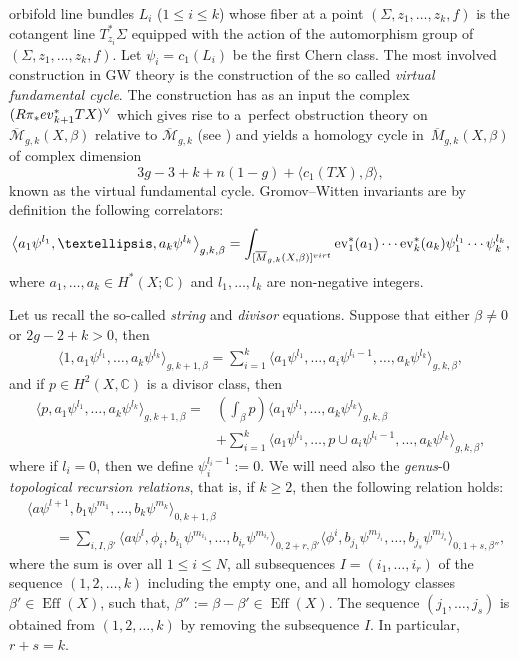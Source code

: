 \documentclass[10pt,a4paper]{article}
\numberwithin{equation}{section}
\newcommand{\CC}{\mathbb{C}}
\newcommand{\M}{\mathcal{M}}
\begin{document}
orbifold line bundles $L_i$ ($1\leq i\leq k$) whose fiber at a
point $(\Sigma,z_1,\dots,z_k,f)$ is the cotangent line
$T^*_{z_i}\Sigma$ equipped with the action of the automorphism group
of $(\Sigma,z_1,\dots,z_k,f)$. Let $\psi_i=c_1(L_i)$ be the first
Chern class. The most involved construction in GW theory is the
construction of the so called {\em virtual fundamental cycle}. The
construction has as an input the complex $(R\pi_*{\rm
 ev}_{k+1}^*TX)^\vee$ which gives rise to a~perfect obstruction
theory on $\overline{\M}_{g,k}(X,\beta)$ relative to
$\overline{\M}_{g,k}$ (see \cite{Be,BF_intnormalcone}) and yields a homology cycle in~$\overline{M}_{g,k}(X,\beta)$ of complex dimension
\[
3g-3 +k + n(1-g) + \langle c_1(TX),\beta\rangle,
\]
known as the virtual fundamental cycle. Gromov--Witten invariants are by
definition the following correlators:
\[
\big\langle a_1\psi^{l_1},\dots, a_k\psi^{l_k}\big\rangle_{g,k,\beta} =
\int_{[\overline{M}_{g,k}(X,\beta)]^{\rm virt}}
\operatorname{ev}_1^*(a_1)\cdots \operatorname{ev}_k^*(a_k)
\psi_1^{l_1}\cdots \psi_k^{l_k},
\]
where $a_1,\dots,a_k\in H^*(X;\CC)$ and $l_1,\dots,l_k$ are
non-negative integers.

Let us recall the so-called {\em string} and {\em divisor} equations. Suppose that either $\beta\neq 0$ or ${2g-2+k>0}$, then
\begin{align*}
\big\langle 1, a_1\psi^{l_1},\dots, a_k\psi^{l_k}\big\rangle_{g,k+1,\beta} =
\sum_{i=1}^k \big\langle
a_1\psi^{l_1},\dots, a_i\psi^{l_i-1}, \dots, a_k\psi^{l_k}\big\rangle_{g,k,\beta},
\end{align*}
and if $p\in H^2(X,\CC)$ is a divisor class, then
\begin{align*}
\big\langle p, a_1\psi^{l_1},\dots, a_k\psi^{l_k}\big\rangle_{g,k+1,\beta} ={} &
\left(\int_\beta p\right) \big\langle a_1\psi^{l_1},\dots, a_k\psi^{l_k}\big\rangle_{g,k,\beta} \\
&+
\sum_{i=1}^k \big\langle
a_1\psi^{l_1},\dots, p\cup a_i\psi^{l_i-1}, \dots, a_k\psi^{l_k}\big\rangle_{g,k,\beta},
\end{align*}
where if $l_i=0$, then we define $\psi_i^{l_i-1}:=0$. We will need
also the {\em genus}-0 {\em topological recursion relations}, that is,
if $k\geq 2$, then the following relation holds:
\begin{align*}
&\big\langle a \psi^{l+1}, b_1\psi^{m_1},\dots,
 b_k\psi^{m_k}
 \big\rangle_{0,k+1,\beta}
 \\
 &\qquad=
 \sum_{i, I,\beta'}\big\langle
 a \psi^l, \phi_i,
 b_{i_1} \psi^{m_{i_1}},\dots,
 b_{i_r} \psi^{m_{i_r}}\big\rangle_{0,2+r,\beta'}
\big\langle
\phi^i, b_{j_1} \psi^{m_{j_1}},\dots,
 b_{j_s} \psi^{m_{j_s}}\big\rangle_{0,1+s,\beta''},
\end{align*}
where the sum is over all $1\leq i\leq N$, all subsequences
$I=(i_1,\dots,i_r)$ of the sequence $(1,2,\dots,k)$ including the
empty one, and all homology
classes $\beta'\in \operatorname{Eff}(X)$, such that,
$\beta'':=\beta-\beta'\in \operatorname{Eff}(X)$. The sequence
$(j_1,\dots,j_s)$ is obtained from $(1,2,\dots,k)$ by removing the
subsequence $I$. In particular, $r+s=k$.
\end{document}
